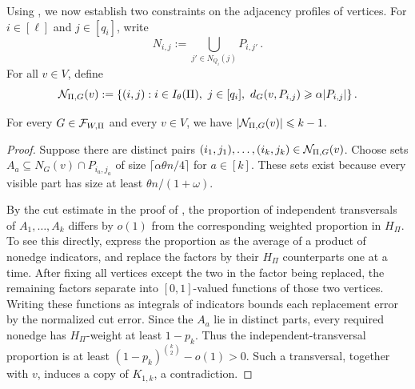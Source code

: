 Using , we now establish two constraints on the adjacency profiles of vertices. For $i\in[\ell]$ and $j\in[q_i]$, write
$$N_{i,j}:=\bigcup_{j'\in N_{Q_i}(j)}P_{i,j'}\,.$$
For all $v\in V$, define
$${\mathcal N}_{\Pi,G}(v):=\{(i,j):i\in I_\theta(\Pi),\ j\in[q_i],\ d_G(v,P_{i,j})\geqslant\alpha |P_{i,j}|\}\,.$$

\begin{lemma}\label{lemma:deterministic-nonlow-bound-K1k}
For every $G\in{\mathcal F}_{W,\Pi}$ and every $v\in V$, we have $|{\mathcal N}_{\Pi,G}(v)|\leqslant k-1$.
\end{lemma}
\begin{proof}
Suppose there are distinct pairs $(i_1,j_1),\dots,(i_k,j_k)\in{\mathcal N}_{\Pi,G}(v)$. Choose sets $A_a\subseteq N_G(v)\cap P_{i_a,j_a}$ of size $\lceil\alpha\theta n/4\rceil$ for $a\in[k]$. These sets exist because every visible part has size at least $\theta n/(1+\omega)$.

By the cut estimate in the proof of , the proportion of independent transversals of $A_1,\dots,A_k$ differs by $o(1)$ from the corresponding weighted proportion in $H_\Pi$. To see this directly, express the proportion as the average of a product of nonedge indicators, and replace the factors by their $H_\Pi$ counterparts one at a time. After fixing all vertices except the two in the factor being replaced, the remaining factors separate into $[0,1]$-valued functions of those two vertices. Writing these functions as integrals of indicators bounds each replacement error by the normalized cut error. Since the $A_a$ lie in distinct parts, every required nonedge has $H_\Pi$-weight at least $1-p_k$. Thus the independent-transversal proportion is at least $(1-p_k)^{\binom{k}{2}}-o(1)>0$. Such a transversal, together with $v$, induces a copy of $K_{1,k}$, a contradiction.
\end{proof}

